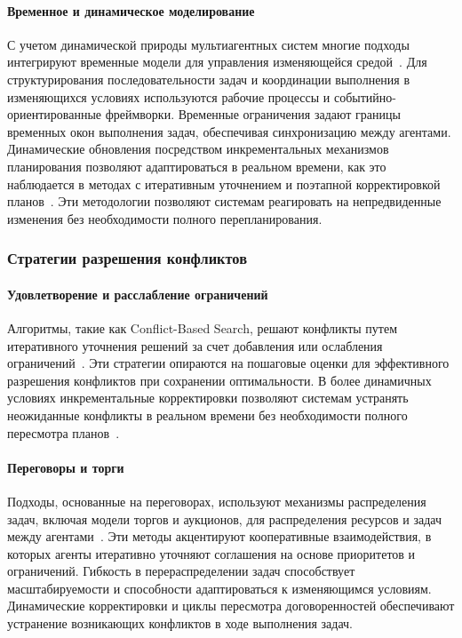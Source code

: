 \documentclass[%
]{ittmm}
\begin{document}
\paragraph{Временное и динамическое моделирование}

С учетом динамической природы мультиагентных систем многие подходы интегрируют временные модели
для управления изменяющейся средой~\cite{MA2021103823,LU2014215}.
Для структурирования последовательности задач и координации выполнения
в изменяющихся условиях используются рабочие процессы и событийно-ориентированные фреймворки.
Временные ограничения задают границы временных окон выполнения задач,
обеспечивая синхронизацию между агентами.
Динамические обновления посредством инкрементальных механизмов планирования позволяют адаптироваться в реальном времени,
как это наблюдается в методах с итеративным уточнением и поэтапной корректировкой планов~\cite{SEMIZ2021220}.
Эти методологии позволяют системам реагировать на непредвиденные изменения без необходимости полного перепланирования.

\subsubsection{Стратегии разрешения конфликтов}

\paragraph{Удовлетворение и расслабление ограничений}

Алгоритмы, такие как Conflict-Based Search,
решают конфликты путем итеративного уточнения решений
за счет добавления или ослабления ограничений~\cite{SHARON201540}.
Эти стратегии опираются на пошаговые оценки для эффективного разрешения конфликтов при сохранении оптимальности.
В более динамичных условиях инкрементальные корректировки позволяют системам
устранять неожиданные конфликты в реальном времени без необходимости полного пересмотра планов~\cite{KOMENDA201476}.

\paragraph{Переговоры и торги}

Подходы, основанные на переговорах, используют механизмы распределения задач,
включая модели торгов и аукционов,
для распределения ресурсов и задач между агентами~\cite{GHARRAD2021108282,FRANKOVIC20017,RABELO1994303}.
Эти методы акцентируют кооперативные взаимодействия,
в которых агенты итеративно уточняют соглашения на основе приоритетов и ограничений.
Гибкость в перераспределении задач способствует масштабируемости и способности адаптироваться к изменяющимся условиям.
Динамические корректировки и циклы пересмотра договоренностей обеспечивают устранение возникающих конфликтов в ходе выполнения задач.
\end{document}
